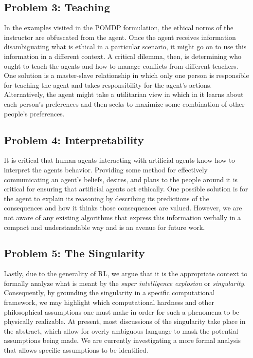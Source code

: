 \documentclass[11pt]{article}
\begin{document}
\subsection{Problem 3: Teaching} In the examples visited in the POMDP formulation, the ethical norms of the instructor are obfuscated from the agent. Once the agent receives information disambiguating what is ethical in a particular scenario, it might go on to use this information in a different context. %
A critical dilemma, then, is determining who ought to teach the agents and how to manage conflicts from different teachers. One solution is a master-slave relationship in which only one person is responsible for teaching the agent and takes responsibility for the agent's actions. Alternatively, the agent might take a utilitarian view in which in it learns about each person's preferences and then seeks to maximize some combination of other people's preferences.

\subsection{Problem 4: Interpretability} It is critical that human agents interacting with artificial agents know how to interpret the agents behavior. Providing some method for effectively communicating an agent's beliefs, desires, and plans to the people around it is critical for ensuring that artificial agents act ethically. One possible solution is for the agent to explain its reasoning by describing its predictions of the consequences and how it thinks those consequences are valued. However, we are not aware of any existing algorithms that express this information verbally in a compact and understandable way and is an avenue for future work.

\subsection{Problem 5: The Singularity} Lastly, due to the generality of RL, we argue that it is the appropriate context to formally analyze what is meant by the {\it super intelligence explosion} or {\it singularity}. Consequently, by grounding the singularity in a specific computational framework, we may highlight which computational hardness and other philosophical assumptions one must make in order for such a phenomena to be physically realizable. At present, most discussions of the singularity take place in the abstract, which allow for overly ambiguous language to mask the potential assumptions being made. We are currently investigating a more formal analysis that allows specific assumptions to be identified.
\end{document}
